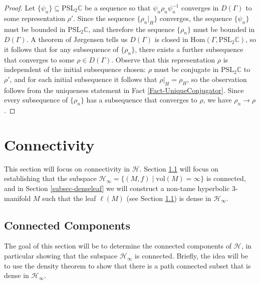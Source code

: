\documentclass[11pt,leqno]{article}
\theoremstyle{introdef}
\numberwithin{lemma}{section}
\theoremstyle{definition}
\newcommand{\C}{\mathbb{C}}
\begin{document}
\begin{proof}
    Let $\{\psi_n\}\subseteq\mathrm{PSL}_2\C$ be a sequence so that $\psi_n\rho_n\psi_n^{-1}$ converges in $D(\Gamma)$ to some representation $\rho'$. Since the sequence $\{\rho_n|_H\}$ converges, the sequence $\{\psi_n\}$ must be bounded in $\mathrm{PSL}_2\C$, and therefore the sequence $\{\rho_n\}$ must be bounded in $D(\Gamma)$. A theorem of J{\o}rgensen \cite{JOR} tells us $D(\Gamma)$ is closed in $\mathrm{Hom}(\Gamma,\mathrm{PSL}_2\C)$, so it follows that for any subsequence of $\{\rho_n\}$, there exists a further subsequence that converges to some $\rho\in D(\Gamma)$. Observe that this representation $\rho$ is independent of the initial subsequence chosen: $\rho$ must be conjugate in $\mathrm{PSL}_2\C$ to $\rho'$, and for each initial subsequence it follows that $\rho|_H=\rho_H$, so the observation follows from the uniqueness statement in Fact \ref{Fact-UniqueConjugator}. Since every subsequence of $\{\rho_n\}$ has a subsequence that converges to $\rho$, we have $\rho_n\rightarrow \rho$.
\end{proof}




\section{Connectivity}
\label{sec-connectivity}

This section will focus on connectivity in $\mathcal{H}$. Section \ref{subsec-comps} will focus on establishing that the subspace $\mathcal{H}_\infty=\{(M,f)\;|\;\mathrm{vol}(M)=\infty\}$ is connected, and in Section \ref{subsec-denseleaf} we will construct a non-tame hyperbolic $3$-manifold $M$ such that the leaf $\ell(M)$ (see Section \ref{subsec-comps}) is dense in $\mathcal{H}_\infty$.


\subsection{Connected Components}
\label{subsec-comps}

The goal of this section will be to determine the connected components of $\mathcal{H}$, in particular showing that the subspace $\mathcal{H}_\infty$ is connected. Briefly, the idea will be to use the density theorem to show that there is a path connected subset that is dense in $\mathcal{H}_\infty$.\par
\end{document}
